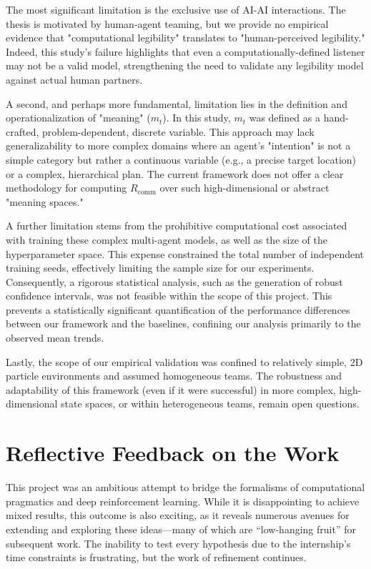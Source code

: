 \documentclass[12pt, a4paper]{report}
\newcommand{\Rcomm}{R_{\text{comm}}}
\begin{document}
The most significant limitation is the exclusive use of AI-AI interactions. The thesis is motivated by human-agent teaming, but we provide no empirical evidence that "computational legibility" translates to "human-perceived legibility." Indeed, this study's failure highlights that even a computationally-defined listener may not be a valid model, strengthening the need to validate any legibility model against actual human partners.

A second, and perhaps more fundamental, limitation lies in the definition and operationalization of "meaning" ($m_t$). In this study, $m_t$ was defined as a hand-crafted, problem-dependent, discrete variable. This approach may lack generalizability to more complex domains where an agent's "intention" is not a simple category but rather a continuous variable (e.g., a precise target location) or a complex, hierarchical plan. The current framework does not offer a clear methodology for computing $\Rcomm$ over such high-dimensional or abstract "meaning spaces."

A further limitation stems from the prohibitive computational cost associated with training these complex multi-agent models, as well as the size of the hyperparameter space. This expense constrained the total number of independent training seeds, effectively limiting the sample size for our experiments. Consequently, a rigorous statistical analysis, such as the generation of robust confidence intervals, was not feasible within the scope of this project. This prevents a statistically significant quantification of the performance differences between our framework and the baselines, confining our analysis primarily to the observed mean trends.

Lastly, the scope of our empirical validation was confined to relatively simple, 2D particle environments and assumed homogeneous teams. The robustness and adaptability of this framework (even if it were successful) in more complex, high-dimensional state spaces, or within heterogeneous teams, remain open questions.

\section{Reflective Feedback on the Work}
This project was an ambitious attempt to bridge the formalisms of computational pragmatics and deep reinforcement learning. While it is disappointing to achieve mixed results, this outcome is also exciting, as it reveals numerous avenues for extending and exploring these ideas---many of which are ``low-hanging fruit'' for subsequent work. The inability to test every hypothesis due to the internship's time constraints is frustrating, but the work of refinement continues.
\end{document}
